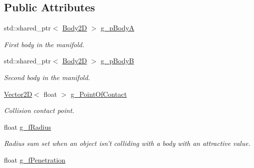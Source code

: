 \subsection*{Public Attributes}
\begin{DoxyCompactItemize}
\item 
\hypertarget{class_collision_manifold2_d_a3cb8f07a11c1510e90ecfd7057bac132}{std\+::shared\+\_\+ptr$<$ \hyperlink{class_body2_d}{Body2\+D} $>$ \hyperlink{class_collision_manifold2_d_a3cb8f07a11c1510e90ecfd7057bac132}{g\+\_\+p\+Body\+A}}\label{class_collision_manifold2_d_a3cb8f07a11c1510e90ecfd7057bac132}

\begin{DoxyCompactList}\small\item\em First body in the manifold. \end{DoxyCompactList}\item 
\hypertarget{class_collision_manifold2_d_a984686fec2c7460f9479c12987392ada}{std\+::shared\+\_\+ptr$<$ \hyperlink{class_body2_d}{Body2\+D} $>$ \hyperlink{class_collision_manifold2_d_a984686fec2c7460f9479c12987392ada}{g\+\_\+p\+Body\+B}}\label{class_collision_manifold2_d_a984686fec2c7460f9479c12987392ada}

\begin{DoxyCompactList}\small\item\em Second body in the manifold. \end{DoxyCompactList}\item 
\hypertarget{class_collision_manifold2_d_a6c9c40573b42b63f54a44eed63f279b0}{\hyperlink{class_vector2_d}{Vector2\+D}$<$ float $>$ \hyperlink{class_collision_manifold2_d_a6c9c40573b42b63f54a44eed63f279b0}{g\+\_\+\+Point\+Of\+Contact}}\label{class_collision_manifold2_d_a6c9c40573b42b63f54a44eed63f279b0}

\begin{DoxyCompactList}\small\item\em Collision contact point. \end{DoxyCompactList}\item 
\hypertarget{class_collision_manifold2_d_af11f8fdabd6c64cd5637cfbb6de4777d}{float \hyperlink{class_collision_manifold2_d_af11f8fdabd6c64cd5637cfbb6de4777d}{g\+\_\+f\+Radius}}\label{class_collision_manifold2_d_af11f8fdabd6c64cd5637cfbb6de4777d}

\begin{DoxyCompactList}\small\item\em Radius sum set when an object isn't colliding with a body with an attractive value. \end{DoxyCompactList}\item 
\hypertarget{class_collision_manifold2_d_a7723c5a4ef26168b35d68c2d437c7dde}{float \hyperlink{class_collision_manifold2_d_a7723c5a4ef26168b35d68c2d437c7dde}{g\+\_\+f\+Penetration}}\label{class_collision_manifold2_d_a7723c5a4ef26168b35d68c2d437c7dde}


\end{DoxyCompactItemize}
